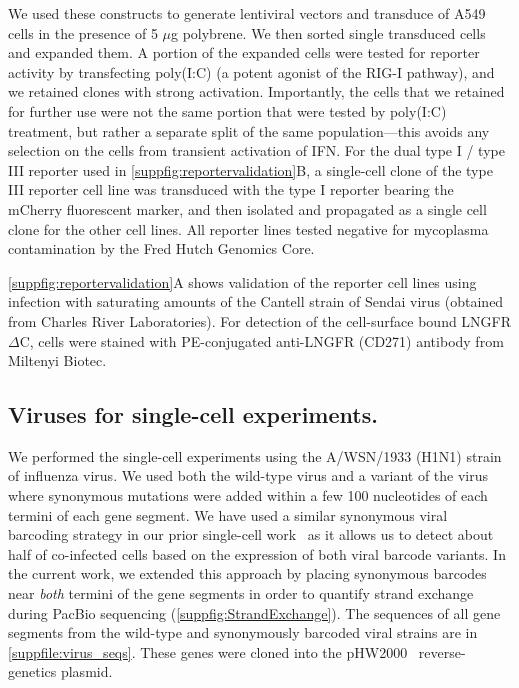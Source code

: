 \documentclass[lineno]{asm-article}
\newcommand{\SUPPFILE}[1]{\autoref{suppfile:#1}}
\newcommand{\SUPPFIG}[1]{\autoref{suppfig:#1}}
\begin{document}
We used these constructs to generate lentiviral vectors and transduce of A549 cells in the presence of 5 $\mu$g polybrene.
We then sorted single transduced cells and expanded them.
A portion of the expanded cells were tested for reporter activity by transfecting poly(I:C) (a potent agonist of the RIG-I pathway), and we retained clones with strong activation.
Importantly, the cells that we retained for further use were not the same portion that were tested by poly(I:C) treatment, but rather a separate split of the same population---this avoids any selection on the cells from transient activation of IFN.
For the dual type I / type III reporter used in \SUPPFIG{reportervalidation}B, a single-cell clone of the type III reporter cell line was transduced with the type I reporter bearing the mCherry fluorescent marker, and then isolated and propagated as a single cell clone for the other cell lines.
All reporter lines tested negative for mycoplasma contamination by the Fred Hutch Genomics Core.

\SUPPFIG{reportervalidation}A shows validation of the reporter cell lines using infection with saturating amounts of the Cantell strain of Sendai virus (obtained from Charles River Laboratories).
For detection of the cell-surface bound LNGFR$\Delta$C, cells were stained with PE-conjugated anti-LNGFR (CD271) antibody from Miltenyi Biotec.

\subsection{Viruses for single-cell experiments.}
We performed the single-cell experiments using the A/WSN/1933 (H1N1) strain of influenza virus.
We used both the wild-type virus and a variant of the virus where synonymous mutations were added within a few 100 nucleotides of each termini of each gene segment.
We have used a similar synonymous viral barcoding strategy in our prior single-cell work~\cite{russell2018extreme} as it allows us to detect about half of co-infected cells based on the expression of both viral barcode variants.
In the current work, we extended this approach by placing synonymous barcodes near \emph{both} termini of the gene segments in order to quantify strand exchange during PacBio sequencing (\SUPPFIG{StrandExchange}).
The sequences of all gene segments from the wild-type and synonymously barcoded viral strains are in \SUPPFILE{virus_seqs}.
These genes were cloned into the pHW2000~\cite{hoffmann2000dna} reverse-genetics plasmid.
\end{document}
